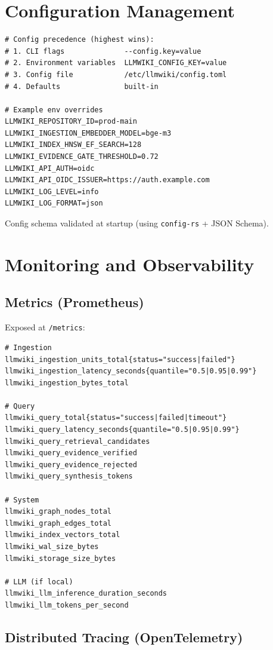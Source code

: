 \section{Configuration Management}
\label{sec:deploy:config}

\begin{verbatim}
# Config precedence (highest wins):
# 1. CLI flags              --config.key=value
# 2. Environment variables  LLMWIKI_CONFIG_KEY=value
# 3. Config file            /etc/llmwiki/config.toml
# 4. Defaults               built-in

# Example env overrides
LLMWIKI_REPOSITORY_ID=prod-main
LLMWIKI_INGESTION_EMBEDDER_MODEL=bge-m3
LLMWIKI_INDEX_HNSW_EF_SEARCH=128
LLMWIKI_EVIDENCE_GATE_THRESHOLD=0.72
LLMWIKI_API_AUTH=oidc
LLMWIKI_API_OIDC_ISSUER=https://auth.example.com
LLMWIKI_LOG_LEVEL=info
LLMWIKI_LOG_FORMAT=json
\end{verbatim}

Config schema validated at startup (using \texttt{config-rs} + JSON Schema).

\section{Monitoring and Observability}
\label{sec:deploy:monitoring}

\subsection{Metrics (Prometheus)}
\label{sec:deploy:metrics}

Exposed at \texttt{/metrics}:

\begin{verbatim}
# Ingestion
llmwiki_ingestion_units_total{status="success|failed"} 
llmwiki_ingestion_latency_seconds{quantile="0.5|0.95|0.99"}
llmwiki_ingestion_bytes_total

# Query
llmwiki_query_total{status="success|failed|timeout"}
llmwiki_query_latency_seconds{quantile="0.5|0.95|0.99"}
llmwiki_query_retrieval_candidates
llmwiki_query_evidence_verified
llmwiki_query_evidence_rejected
llmwiki_query_synthesis_tokens

# System
llmwiki_graph_nodes_total
llmwiki_graph_edges_total
llmwiki_index_vectors_total
llmwiki_wal_size_bytes
llmwiki_storage_size_bytes

# LLM (if local)
llmwiki_llm_inference_duration_seconds
llmwiki_llm_tokens_per_second
\end{verbatim}

\subsection{Distributed Tracing (OpenTelemetry)}
\label{sec:deploy:tracing}

